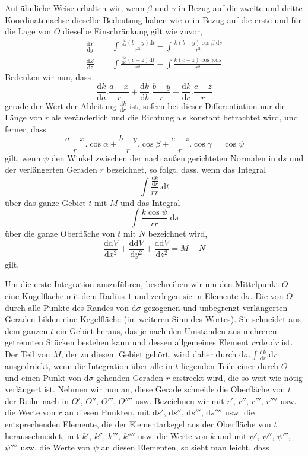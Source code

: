 Auf ähnliche Weise erhalten wir, wenn $\beta$ und $\gamma$ in Bezug auf die zweite und dritte Koordinatenachse dieselbe Bedeutung haben wie $\alpha$ in Bezug auf die erste und für die Lage von $O$ dieselbe Einschränkung gilt wie zuvor,
\[
\begin{aligned}
\frac{\mathrm{d}Y}{\mathrm{d}y}&=\int\frac{\frac{\mathrm{d}k}{\mathrm{d}b}(b-y)\mathrm{d}t}{r^3}-\int\frac{k(b-y)\cos\beta.\mathrm{d}s}{r^3}\\
\frac{\mathrm{d}Z}{\mathrm{d}z}&=\int\frac{\frac{\mathrm{d}k}{\mathrm{d}c}(c-z)\mathrm{d}t}{r^3}-\int\frac{k(c-z)\cos\gamma.\mathrm{d}s}{r^3}
\end{aligned}
\]
Bedenken wir nun, dass
\[
\frac{\mathrm{d}k}{\mathrm{d}a}.\frac{a-x}{r}+\frac{\mathrm{d}k}{\mathrm{d}b}.\frac{b-y}{r}+\frac{\mathrm{d}k}{\mathrm{d}c}.\frac{c-z}{r}
\]
%
gerade der Wert der Ableitung $\frac{\mathrm{d}k}{\mathrm{d}r}$ ist, sofern bei dieser Differentiation nur die Länge von $r$ als veränderlich und die Richtung als konstant betrachtet wird, und ferner, dass
\[
\frac{a-x}{r}.\cos\alpha+\frac{b-y}{r}.\cos\beta+\frac{c-z}{r}.\cos\gamma=\cos\psi
\]
gilt, wenn $\psi$ den Winkel zwischen der nach außen gerichteten Normalen in $\mathrm{d}s$ und der verlängerten Geraden $r$ bezeichnet, so folgt, dass, wenn das Integral
\[
\int\frac{\frac{\mathrm{d}k}{\mathrm{d}r}}{rr}.\mathrm{d}t
\]
über das ganze Gebiet $t$ mit $M$ und das Integral
\[
\int\frac{k\cos\psi}{rr}.\mathrm{d}s
\]
über die ganze Oberfläche von $t$ mit $N$ bezeichnet wird,
\[
\frac{\mathrm{d}\mathrm{d}V}{\mathrm{d}x^2}+\frac{\mathrm{d}\mathrm{d}V}{\mathrm{d}y^2}+\frac{\mathrm{d}\mathrm{d}V}{\mathrm{d}z^2}=M-N
\]
gilt.

Um die erste Integration auszuführen, beschreiben wir um den Mittelpunkt $O$ eine Kugelfläche mit dem Radius $1$ und zerlegen sie in Elemente $\mathrm{d}\sigma$. Die von $O$ durch alle Punkte des Randes von $\mathrm{d}\sigma$ gezogenen und unbegrenzt verlängerten Geraden bilden eine Kegelfläche (im weiteren Sinn des Wortes). Sie schneidet aus dem ganzen $t$ ein Gebiet heraus, das je nach den Umständen aus mehreren getrennten Stücken bestehen kann und dessen allgemeines Element $rr\mathrm{d}\sigma.\mathrm{d}r$ ist. Der Teil von $M$, der zu diesem Gebiet gehört, wird daher durch $\mathrm{d}\sigma.\int\frac{\mathrm{d}k}{\mathrm{d}r}.\mathrm{d}r$ ausgedrückt, wenn die Integration über alle in $t$ liegenden Teile einer durch $O$ und einen Punkt von $\mathrm{d}\sigma$ gehenden Geraden $r$ erstreckt wird, die so weit wie nötig verlängert ist. Nehmen wir nun an, diese Gerade schneide die Oberfläche von $t$ der Reihe nach in $O'$, $O''$, $O'''$, $O''''$ usw. Bezeichnen wir mit $r'$, $r''$, $r'''$, $r''''$ usw. die Werte von $r$ an diesen Punkten, mit $\mathrm{d}s'$, $\mathrm{d}s''$, $\mathrm{d}s'''$, $\mathrm{d}s''''$ usw. die entsprechenden Elemente, die der Elementarkegel aus der Oberfläche von $t$ herausschneidet, mit $k'$, $k''$, $k'''$, $k''''$ usw. die Werte von $k$ und mit $\psi'$, $\psi''$, $\psi'''$, $\psi''''$ usw. die Werte von $\psi$ an diesen Elementen, so sieht man leicht, dass
%


